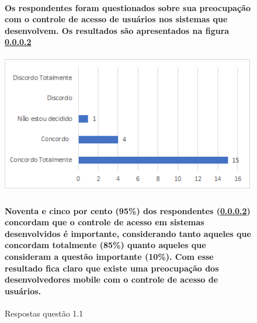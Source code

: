 \begin{figure}[!b]
\centering
\paragraph{
Os respondentes foram questionados sobre sua preocupação com o controle de acesso de usuários nos sistemas que desenvolvem. Os resultados são apresentados na figura \ref{fig:1.1}
}
\includegraphics[scale=0.8]{figuras das questoes/1.1.PNG}
\caption{Respostas questão 1.1}

\paragraph{
Noventa e cinco por cento (95{\%}) dos respondentes (\ref{fig:1.1}) concordam que o controle de acesso em sistemas desenvolvidos é importante, considerando tanto aqueles que concordam totalmente (85{\%}) quanto aqueles que consideram a questão importante (10{\%}). Com esse resultado fica claro que existe uma preocupação dos desenvolvedores mobile com o controle de acesso de usuários.
}

\label{fig:1.1}
\end{figure}
